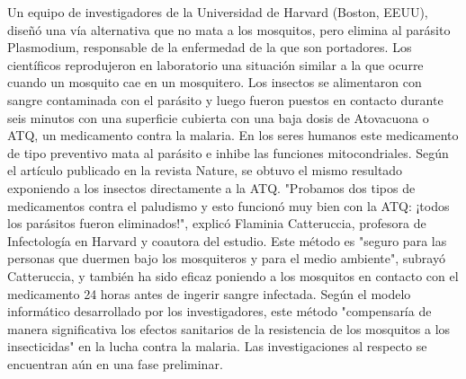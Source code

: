\documentclass{article}%
\begin{document}
\newline%
%
Un equipo de investigadores de la Universidad de Harvard (Boston, EEUU), diseñó una vía alternativa que no mata a los mosquitos, pero elimina al parásito Plasmodium, responsable de la enfermedad de la que son portadores. \newline%
\newline%
Los científicos reprodujeron en laboratorio una situación similar a la que ocurre cuando un mosquito cae en un mosquitero.%
\newline%
%
Los insectos se alimentaron con sangre contaminada con el parásito y luego fueron puestos en contacto durante seis minutos con una superficie cubierta con una baja dosis de Atovacuona o ATQ, un medicamento contra la malaria.%
\newline%
%
En los seres humanos este medicamento de tipo preventivo mata al parásito e inhibe las funciones mitocondriales. Según el artículo publicado en la revista Nature, se obtuvo el mismo resultado exponiendo a los insectos directamente a la ATQ.%
\newline%
%
"Probamos dos tipos de medicamentos contra el paludismo y esto funcionó muy bien con la ATQ: ¡todos los parásitos fueron eliminados!", explicó Flaminia Catteruccia, profesora de Infectología en Harvard y coautora del estudio.%
\newline%
%
Este método es "seguro para las personas que duermen bajo los mosquiteros y para el medio ambiente", subrayó Catteruccia, y también ha sido eficaz poniendo a los mosquitos en contacto con el medicamento 24 horas antes de ingerir sangre infectada.%
\newline%
%
Según el modelo informático desarrollado por los investigadores, este método "compensaría de manera significativa los efectos sanitarios de la resistencia de los mosquitos a los insecticidas" en la lucha contra la malaria. \newline%
\newline%
Las investigaciones al respecto se encuentran aún en una fase preliminar.%
\newline%
%
\end{document}
